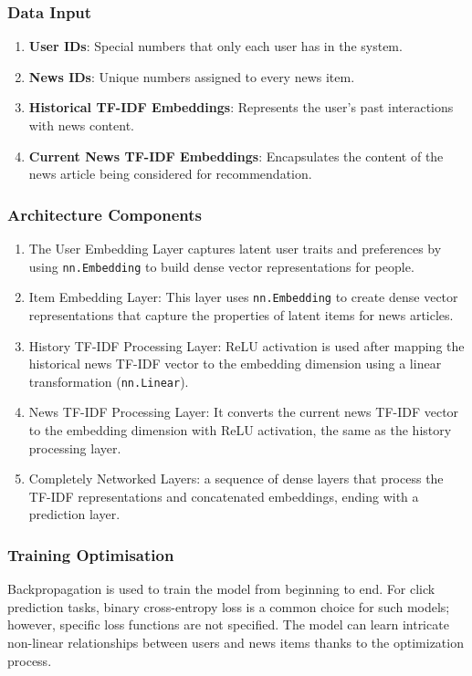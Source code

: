 \documentclass[9pt,twocolumn,twoside,lineno]{gsajnl}
\begin{document}
\subsubsection{Data Input}
\begin{enumerate}
    \item \textbf{User IDs}: Special numbers that only each user has in the system.
    \item \textbf{News IDs}: Unique numbers assigned to every news item.
    \item \textbf{Historical TF-IDF Embeddings}: Represents the user's past interactions with news content.
    \item \textbf{Current News TF-IDF Embeddings}: Encapsulates the content of the news article being considered for recommendation.
\end{enumerate}

\subsubsection{Architecture Components}
\begin{enumerate}
    \item The User Embedding Layer captures latent user traits and preferences by using \texttt{nn.Embedding} to build dense vector representations for people.
    \item Item Embedding Layer: This layer uses \texttt{nn.Embedding} to create dense vector representations that capture the properties of latent items for news articles.
    \item History TF-IDF Processing Layer: ReLU activation is used after mapping the historical news TF-IDF vector to the embedding dimension using a linear transformation (\texttt{nn.Linear}).
    \item News TF-IDF Processing Layer: It converts the current news TF-IDF vector to the embedding dimension with ReLU activation, the same as the history processing layer.
    \item Completely Networked Layers: a sequence of dense layers that process the TF-IDF representations and concatenated embeddings, ending with a prediction layer.
\end{enumerate}

\subsubsection{Training Optimisation\newline}
Backpropagation is used to train the model from beginning to end. For click prediction tasks, binary cross-entropy loss is a common choice for such models; however, specific loss functions are not specified. The model can learn intricate non-linear relationships between users and news items thanks to the optimization process.
\end{document}
